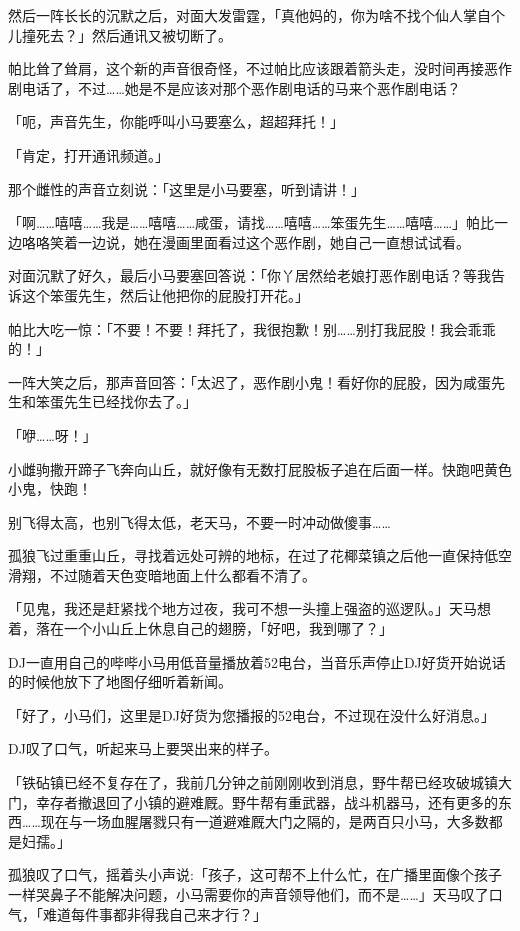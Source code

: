 然后一阵长长的沉默之后，对面大发雷霆，「真他妈的，你为啥不找个仙人掌自个儿撞死去？」然后通讯又被切断了。

帕比耸了耸肩，这个新的声音很奇怪，不过帕比应该跟着箭头走，没时间再接恶作剧电话了，不过……她是不是应该对那个恶作剧电话的马来个恶作剧电话？

「呃，声音先生，你能呼叫小马要塞么，超超拜托！」

「{\mt 肯定，打开通讯频道。}」

那个雌性的声音立刻说：「这里是小马要塞，听到请讲！」

「啊……嘻嘻……我是……嘻嘻……咸蛋，请找……嘻嘻……笨蛋先生……嘻嘻……」帕比一边咯咯笑着一边说，她在漫画里面看过这个恶作剧，她自己一直想试试看。

对面沉默了好久，最后小马要塞回答说：「你丫居然给老娘打恶作剧电话？等我告诉这个笨蛋先生，然后让他把你的屁股打开花。」

帕比大吃一惊：「不要！不要！拜托了，我很抱歉！别……别打我屁股！我会乖乖的！」

一阵大笑之后，那声音回答：「太迟了，恶作剧小鬼！看好你的屁股，因为咸蛋先生和笨蛋先生已经找你去了。」

「咿……呀！」

小雌驹撒开蹄子飞奔向山丘，就好像有无数打屁股板子追在后面一样。快跑吧黄色小鬼，快跑！

\horizonline


别飞得太高，也别飞得太低，老天马，不要一时冲动做傻事……

孤狼飞过重重山丘，寻找着远处可辨的地标，在过了花椰菜镇之后他一直保持低空滑翔，不过随着天色变暗地面上什么都看不清了。

「见鬼，我还是赶紧找个地方过夜，我可不想一头撞上强盗的巡逻队。」天马想着，落在一个小山丘上休息自己的翅膀，「好吧，我到哪了？」

DJ一直用自己的哔哔小马用低音量播放着52电台，当音乐声停止DJ好货开始说话的时候他放下了地图仔细听着新闻。

「{\rt 好了，小马们，这里是DJ好货为您播报的52电台，不过现在没什么好消息。}」

DJ叹了口气，听起来马上要哭出来的样子。

「{\rt 铁砧镇已经不复存在了，我前几分钟之前刚刚收到消息，野牛帮已经攻破城镇大门，幸存者撤退回了小镇的避难厩。野牛帮有重武器，战斗机器马，还有更多的东西……现在与一场血腥屠戮只有一道避难厩大门之隔的，是两百只小马，大多数都是妇孺。}」

孤狼叹了口气，摇着头小声说:「孩子，这可帮不上什么忙，在广播里面像个孩子一样哭鼻子不能解决问题，小马需要你的声音领导他们，而不是……」天马叹了口气，「难道每件事都非得我自己来才行？」

